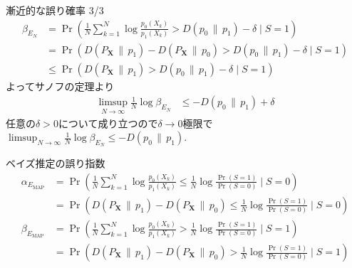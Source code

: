 \documentclass[lualatex,handout]{beamer}
\newcommand\KL[2]{D\left(#1\,\|\,#2\right)}
\theoremstyle{definition}
\begin{document}
\begin{frame}{漸近的な誤り確率 3/3}
\small
\begin{align*}
\beta_{E_N} &= \Pr\left(\frac1N\sum_{k=1}^N\log \frac{p_0(X_k)}{p_1(X_k)} > \KL{p_0}{p_1}-\delta \mid S = 1\right)\\
&= \Pr\left(\KL{P_{\symbf{X}}}{p_1} - \KL{P_{\symbf{X}}}{p_0} > \KL{p_0}{p_1}-\delta \mid S = 1\right)\\
&\le \Pr\left(\KL{P_{\symbf{X}}}{p_1} > \KL{p_0}{p_1}-\delta \mid S = 1\right)
\end{align*}
よってサノフの定理より
\begin{align*}
\limsup_{N\to\infty} \frac1N \log\beta_{E_N} &\le -\KL{p_0}{p_1}+\delta
\end{align*}
任意の$\delta>0$について成り立つので$\delta\to0$極限で
$\limsup_{N\to\infty} \frac1N \log\beta_{E_N} \le -\KL{p_0}{p_1}$.
\end{frame}

\begin{frame}{ベイズ推定の誤り指数}
\begin{align*}
\alpha_{E_{\mathrm{MAP}}} &= \Pr\left(\frac1N\sum_{k=1}^N\log \frac{p_0(X_k)}{p_1(X_k)} \le \frac1N\log\frac{\Pr(S=1)}{\Pr(S=0)}\mid S = 0\right)\\
&= \Pr\left(\KL{P_{\symbf{X}}}{p_1} - \KL{P_{\symbf{X}}}{p_0} \le \frac1N\log\frac{\Pr(S=1)}{\Pr(S=0)}\mid S = 0\right)\\
\beta_{E_{\mathrm{MAP}}} &= \Pr\left(\frac1N\sum_{k=1}^N\log \frac{p_0(X_k)}{p_1(X_k)} > \frac1N\log\frac{\Pr(S=1)}{\Pr(S=0)}\mid S = 1\right)\\
&= \Pr\left(\KL{P_{\symbf{X}}}{p_1} - \KL{P_{\symbf{X}}}{p_0} > \frac1N\log\frac{\Pr(S=1)}{\Pr(S=0)}\mid S = 1\right)
\end{align*}
\end{frame}
\fi
\end{document}
